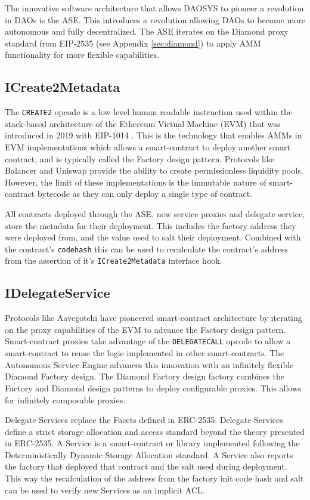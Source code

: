 \documentclass[journal,twocolumn,12pt]{ieeesyscoin}
\begin{document}
The innovative software architecture that allows DAOSYS to pioneer a revolution in DAOs is the ASE. This introduces a revolution allowing DAOs to become more autonomous and fully decentralized. The ASE iterates on the Diamond proxy standard from EIP-2535 (see Appendix \ref{sec:diamond}) to apply AMM functionality for more flexible capabilities.

\subsection{ICreate2Metadata}

The \texttt{CREATE2} opcode is a low level human readable instruction used within the stack-based architecture of the Ethereum Virtual Machine (EVM) that was introduced in 2019 with EIP-1014 \cite{But18}. This is the technology that enables AMMs in EVM implementations which allows a smart-contract to deploy another smart contract, and is typically called the Factory design pattern. Protocols like Balancer and Uniswap provide the ability to create permissionless liquidity pools. However, the limit of these implementations is the immutable nature of smart-contract bytecode as they can only deploy a single type of contract. 

All contracts deployed through the ASE, new service proxies and delegate service, store the metadata for their deployment. This includes the factory address they were deployed from, and the value used to salt their deployment. Combined with the contract’s \texttt{codehash} this can be used to recalculate the contract’s address from the assertion of it’s \texttt{ICreate2Metadata} interface hook.

\subsection{IDelegateService}

Protocols like Aavegotchi have pioneered smart-contract architecture by iterating on the proxy capabilities of the EVM to advance the Factory design pattern. Smart-contract proxies take advantage of the \texttt{DELEGATECALL} opcode to allow a smart-contract to reuse the logic implemented in other smart-contracts. The Autonomous Service Engine advances this innovation with an infinitely flexible Diamond Factory design. The Diamond Factory design factory combines the Factory and Diamond design patterns to deploy configurable proxies. This allows for infinitely composable proxies.

Delegate Services replace the Facets defined in ERC-2535. Delegate Services define a strict storage allocation and access standard beyond the theory presented in ERC-2535. A Service is a smart-contract or library implemented following the Deterministically Dynamic Storage Allocation standard. A Service also reports the factory that deployed that contract and the salt used during deployment. This way the recalculation of the address from the factory init code hash and salt can be used to verify new Services as an implicit ACL.
\end{document}
